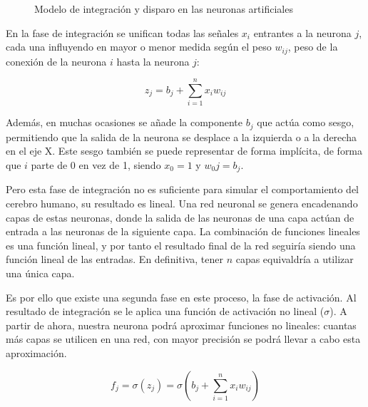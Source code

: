 \begin{figure}[H]
\centering
    \caption{Modelo de integración y disparo en las neuronas artificiales} \label{fig:figura2}
\end{figure}

En la fase de integración se unifican todas las señales $x_i$ entrantes a la neurona $j$, cada una influyendo en mayor o menor medida según el peso $w_{ij}$, peso de la conexión de la neurona $i$ hasta la neurona $j$:

\begin{equation}
    z_j = b_j + \sum_{i=1}^{n} x_iw_{ij}
\end{equation}

Además, en muchas ocasiones se añade la componente $b_j$ que actúa como sesgo, permitiendo que la salida de la neurona se desplace a la izquierda o a la derecha en el eje X. Este sesgo también se puede representar de forma implícita, de forma que $i$ parte de 0 en vez de 1, siendo $x_0 = 1$ y $w_0j = b_j$.

Pero esta fase de integración no es suficiente para simular el comportamiento del cerebro humano, su resultado es lineal. Una red neuronal se genera encadenando capas de estas neuronas, donde la salida de las neuronas de una capa actúan de entrada a las neuronas de la siguiente capa. La combinación de funciones lineales es una función lineal, y por tanto el resultado final de la red seguiría siendo una función lineal de las entradas. En definitiva, tener $n$ capas equivaldría a utilizar una única capa.

Es por ello que existe una segunda fase en este proceso, la fase de activación. Al resultado de integración se le aplica una función de activación no lineal ($\sigma$). A partir de ahora, nuestra neurona podrá aproximar funciones no lineales: cuantas más capas se utilicen en una red, con mayor precisión se podrá llevar a cabo esta aproximación.

\begin{equation}
    f_j = \sigma(z_j) = \sigma(b_j + \sum_{i=1}^{n} x_iw_{ij})
\end{equation}

